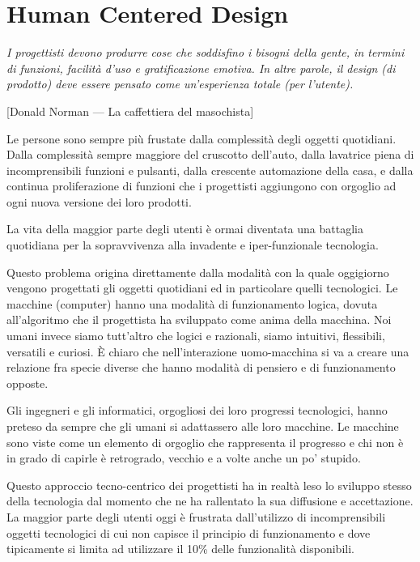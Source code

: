\chapter{Human Centered Design}

\textit{I progettisti devono produrre cose che soddisfino i bisogni della gente, in termini di funzioni, facilità d’uso e gratificazione emotiva. In altre
parole, il design (di prodotto) deve essere pensato come un’esperienza totale (per l'utente).}

[Donald Norman — La caffettiera del masochista]
\vspace{\baselineskip}

Le persone sono sempre più frustate dalla complessità degli oggetti quotidiani. Dalla complessità sempre maggiore del cruscotto dell'auto, dalla lavatrice
piena di incomprensibili funzioni e pulsanti, dalla crescente automazione della casa, e dalla continua proliferazione di funzioni che i progettisti
aggiungono con orgoglio ad ogni nuova versione dei loro prodotti.

La vita della maggior parte degli utenti è ormai diventata una battaglia quotidiana per la sopravvivenza alla invadente e iper-funzionale
tecnologia. %

Questo problema origina direttamente dalla modalità con la quale oggigiorno vengono progettati gli oggetti quotidiani ed in particolare quelli tecnologici.
Le macchine (computer) hanno una modalità di funzionamento logica, dovuta all'algoritmo che il progettista ha sviluppato come anima della macchina.
Noi umani invece siamo tutt'altro che logici e razionali, siamo intuitivi, flessibili, versatili e curiosi. \`E chiaro che nell'interazione
uomo-macchina si va a creare una relazione fra specie diverse che hanno modalità di pensiero e di funzionamento opposte.

Gli ingegneri e gli informatici, orgogliosi dei loro progressi tecnologici, hanno preteso da sempre che gli umani si adattassero alle loro macchine.
Le macchine sono viste come un elemento di orgoglio che rappresenta il progresso e chi non è in grado di capirle è retrogrado, vecchio e a volte anche
un po' stupido.

Questo approccio tecno-centrico dei progettisti ha in realtà leso lo sviluppo stesso della tecnologia dal momento che ne ha rallentato la sua diffusione
e accettazione. La maggior parte degli utenti oggi è frustrata dall'utilizzo di incomprensibili oggetti tecnologici di cui non capisce il principio
di funzionamento e dove tipicamente si limita ad utilizzare il 10\% delle funzionalità disponibili.

